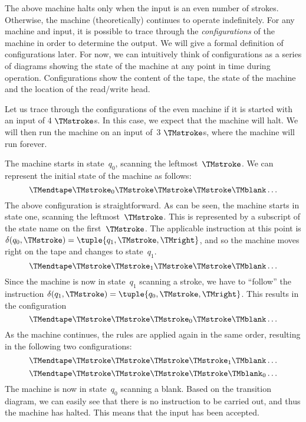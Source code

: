 \documentclass[../../../include/open-logic-section]{subfiles}
\begin{document}
\begin{explain}
The above machine halts only when the input is an even number of strokes.
Otherwise, the machine (theoretically) continues to operate indefinitely. 
For any machine and input, it is possible to trace through the 
\emph{configurations} of the machine in order to determine the output. 
We will give a formal definition of configurations later. For now,
we can intuitively think of configurations as a series of diagrams showing the 
state of the machine at any point in time during operation.
Configurations show the content of the tape, the state of the machine and the
location of the read/write head.

Let us trace through the configurations of the even machine if it is
started with an input of $4$ $\TMstroke$s. In this case, we expect that the
machine will halt.  We will then run the machine on an input of~$3$
$\TMstroke$s, where the machine will run forever.

The machine starts in state~$q_0$, scanning the leftmost~$\TMstroke$.
We can represent the initial state of the machine as follows:
\[
\TMendtape \TMstroke_0 \TMstroke \TMstroke \TMstroke \TMblank \ldots
\]
The above configuration is straightforward. As can be seen, the
machine starts in state one, scanning the leftmost~$\TMstroke$. This
is represented by a subscript of the state name on the
first~$\TMstroke$. The applicable instruction at this point is
$\delta(q_0, \TMstroke) = \tuple{q_1, \TMstroke, \TMright}$, and so
the machine moves right on the tape and changes to state~$q_1$.
\[
\TMendtape \TMstroke \TMstroke_1 \TMstroke \TMstroke \TMblank \ldots
\]
Since the machine is now in state~$q_1$ scanning a stroke, we have to
``follow'' the instruction $\delta(q_1, \TMstroke) = \tuple{q_0,
  \TMstroke, \TMright}$. This results in the configuration
\[
\TMendtape \TMstroke \TMstroke \TMstroke_0 \TMstroke \TMblank \ldots
\]
As the machine continues, the rules are applied again in the same
order, resulting in the following two configurations:
\[
\TMendtape \TMstroke \TMstroke \TMstroke \TMstroke_1 \TMblank \ldots
\]
\[
\TMendtape \TMstroke \TMstroke \TMstroke \TMstroke \TMblank_0 \ldots
\]
The machine is now in state~$q_0$ scanning a blank. Based on the
transition diagram, we can easily see that there is no instruction to be
carried out, and thus the machine has halted. This means that the input
has been accepted.


\end{explain}
\end{document}
